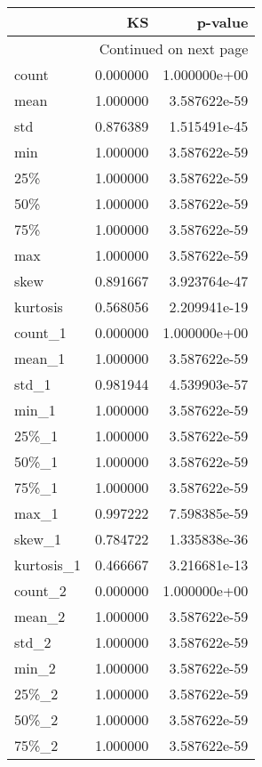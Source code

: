 \begin{longtable}{lrr}
\label{table:line-intensity-ks}
\toprule
{} &        KS &       p-value \\
\midrule
\endhead
\midrule
\multicolumn{3}{r}{{Continued on next page}} \\
\midrule
\endfoot

\bottomrule
\endlastfoot
count      &  0.000000 &  1.000000e+00 \\
mean       &  1.000000 &  3.587622e-59 \\
std        &  0.876389 &  1.515491e-45 \\
min        &  1.000000 &  3.587622e-59 \\
25\%        &  1.000000 &  3.587622e-59 \\
50\%        &  1.000000 &  3.587622e-59 \\
75\%        &  1.000000 &  3.587622e-59 \\
max        &  1.000000 &  3.587622e-59 \\
skew       &  0.891667 &  3.923764e-47 \\
kurtosis   &  0.568056 &  2.209941e-19 \\
count\_1    &  0.000000 &  1.000000e+00 \\
mean\_1     &  1.000000 &  3.587622e-59 \\
std\_1      &  0.981944 &  4.539903e-57 \\
min\_1      &  1.000000 &  3.587622e-59 \\
25\%\_1      &  1.000000 &  3.587622e-59 \\
50\%\_1      &  1.000000 &  3.587622e-59 \\
75\%\_1      &  1.000000 &  3.587622e-59 \\
max\_1      &  0.997222 &  7.598385e-59 \\
skew\_1     &  0.784722 &  1.335838e-36 \\
kurtosis\_1 &  0.466667 &  3.216681e-13 \\
count\_2    &  0.000000 &  1.000000e+00 \\
mean\_2     &  1.000000 &  3.587622e-59 \\
std\_2      &  1.000000 &  3.587622e-59 \\
min\_2      &  1.000000 &  3.587622e-59 \\
25\%\_2      &  1.000000 &  3.587622e-59 \\
50\%\_2      &  1.000000 &  3.587622e-59 \\
75\%\_2      &  1.000000 &  3.587622e-59 \\

\end{longtable}
